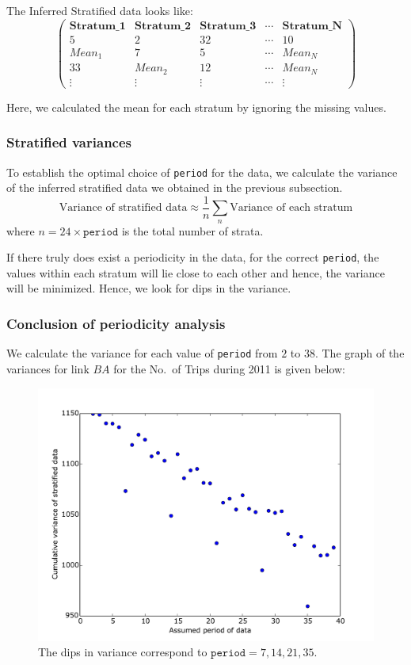 \documentclass[10pt,a4paper]{amsart}
\begin{document}
The Inferred Stratified data looks like:
	\[ \left( \begin{array}{ccccc}
	\mathbf{Stratum\_1} & \mathbf{Stratum\_2} & \mathbf{Stratum\_3} & \cdots &
		\mathbf{Stratum\_N} \\
	5 & 2 & 32 & \cdots & 10 \\
	Mean_1 & 7 & 5 & \cdots & Mean_N \\
	33 & Mean_2 & 12 & \cdots & Mean_N \\
	\vdots & \vdots & \vdots & \cdots & \vdots
	\end{array} \right)\]

Here, we calculated the mean for each stratum by ignoring the missing values.

\subsubsection{Stratified variances}
To establish the optimal choice of \texttt{period} for the data, we calculate
the variance of the inferred stratified data we obtained in the previous
subsection.
	\[\text{Variance of stratified data} \approx \frac{1}{n}
		\sum_n{\text{Variance of each stratum}}\]
where \(n=24\times\mathtt{period}\) is the total number of strata.

If there truly does exist a periodicity in the data, for the correct
\texttt{period}, the values within each stratum will lie close to each other
and hence, the variance will be minimized. Hence, we look for dips in the
variance.

\subsubsection{Conclusion of periodicity analysis}
We calculate the variance for each value of \texttt{period} from \(2\) to
\(38\). The graph of the variances for link \(BA\) for the No.\ of Trips
during 2011 is given below:

\begin{figure}[hbtp]
\centering
\includegraphics[scale=0.5]{Figures/Periodicity_analysis_BA_Trips.pdf} 
\caption{The dips in variance correspond to \(\mathtt{period}=7,14,21,35\).}
\end{figure}
\end{document}
